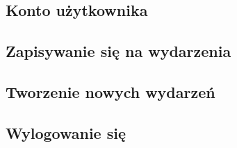 \documentclass[11pt,a4paper]{article}
\begin{document}
\subsection{Konto użytkownika}

\subsection{Zapisywanie się na wydarzenia}

\subsection{Tworzenie nowych wydarzeń}

\subsection{Wylogowanie się}
\end{document}
